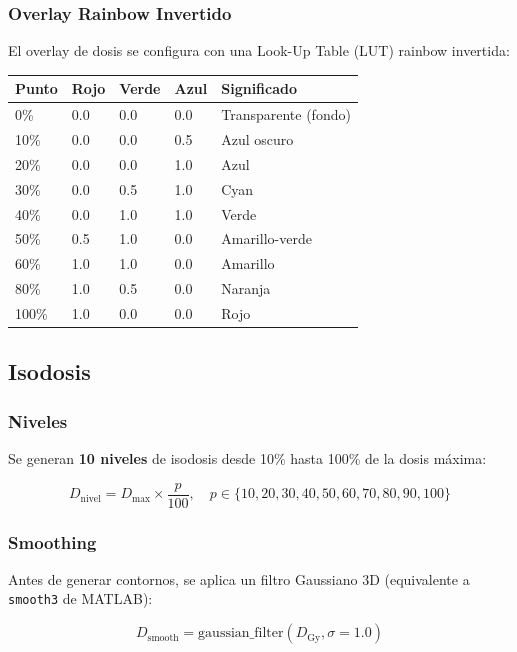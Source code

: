 \documentclass[12pt,a4paper]{article}
\begin{document}
\subsubsection{Overlay Rainbow Invertido}

El overlay de dosis se configura con una Look-Up Table (LUT) rainbow invertida:

\begin{tabular}{p{1.5cm} p{2cm} p{2cm} p{2cm} p{3cm}}
\toprule
\textbf{Punto} & \textbf{Rojo} & \textbf{Verde} & \textbf{Azul} & \textbf{Significado} \\
\midrule
0\% & 0.0 & 0.0 & 0.0 & Transparente (fondo) \\
10\% & 0.0 & 0.0 & 0.5 & Azul oscuro \\
20\% & 0.0 & 0.0 & 1.0 & Azul \\
30\% & 0.0 & 0.5 & 1.0 & Cyan \\
40\% & 0.0 & 1.0 & 1.0 & Verde \\
50\% & 0.5 & 1.0 & 0.0 & Amarillo-verde \\
60\% & 1.0 & 1.0 & 0.0 & Amarillo \\
80\% & 1.0 & 0.5 & 0.0 & Naranja \\
100\% & 1.0 & 0.0 & 0.0 & Rojo \\
\bottomrule
\end{tabular}

\subsection{Isodosis}

\subsubsection{Niveles}

Se generan \textbf{10 niveles} de isodosis desde 10\% hasta 100\% de la dosis máxima:

$$D_{\text{nivel}} = D_{\max} \times \frac{p}{100}, \quad p \in \{10, 20, 30, 40, 50, 60, 70, 80, 90, 100\}$$

\subsubsection{Smoothing}

Antes de generar contornos, se aplica un filtro Gaussiano 3D (equivalente a \texttt{smooth3} de MATLAB):

$$D_{\text{smooth}} = \text{gaussian\_filter}(D_{\text{Gy}}, \sigma = 1.0)$$
\end{document}
